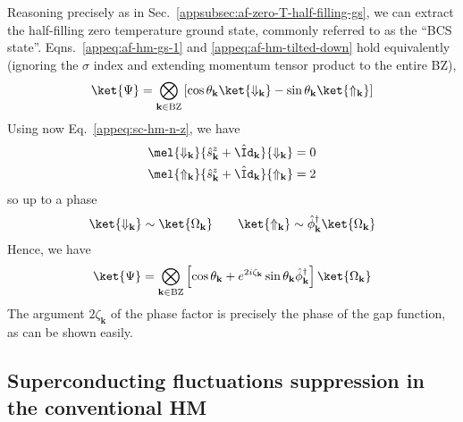 Reasoning precisely as in Sec.~\ref{appsubsec:af-zero-T-half-filling-gs}, we can extract the half-filling zero temperature ground state, commonly referred to as the ``BCS state''. Eqns.~\eqref{appeq:af-hm-gs-1} and \eqref{appeq:af-hm-tilted-down} hold equivalently (ignoring the $\sigma$ index and extending momentum tensor product to the entire BZ),
\[
	\ket{\Psi} = \bigotimes_{\mathbf{k}\in\mathrm{BZ}} \left[
		\cos \theta_\mathbf{k} \ket{\Downarrow_\mathbf{k}} - \sin \theta_\mathbf{k} \ket{\Uparrow_\mathbf{k}}
	\right]
\]
Using now Eq.~\eqref{appeq:sc-hm-n-z}, we have
\[
\begin{aligned}
	\mel{\Downarrow_\mathbf{k}}{\hat s_\mathbf{k}^z + \hat \Id_\mathbf{k}}{\Downarrow_\mathbf{k}} &= 0 \\
	\mel{\Uparrow_\mathbf{k}}{\hat s_\mathbf{k}^z + \hat \Id_\mathbf{k}}{\Uparrow_\mathbf{k}} &= 2
\end{aligned}
\]
so up to a phase
\[
	\ket{\Downarrow_\mathbf{k}} \sim \ket{\Omega_\mathbf{k}}
	\qquad
	\ket{\Uparrow_\mathbf{k}} \sim \hat \phi_\mathbf{k}^\dagger \ket{\Omega_\mathbf{k}}
\]
Hence, we have
\begin{equation}\label{appeq:sc-hm-gs}
	\ket{\Psi} = \bigotimes_{\mathbf{k}\in\mathrm{BZ}} \left[
		\cos \theta_\mathbf{k} + e^{2i\zeta_\mathbf{k}} \sin \theta_\mathbf{k} \hat \phi_\mathbf{k}^\dagger
	\right] \ket{\Omega_\mathbf{k}}
\end{equation}
The argument $2\zeta_\mathbf{k}$ of the phase factor is precisely the phase of the gap function, as can be shown easily.

\subsection{Superconducting fluctuations suppression in the conventional HM}\label{appsubsec:sc-hm-impossible}

